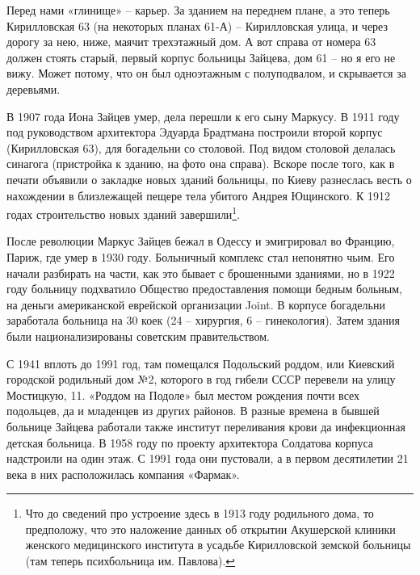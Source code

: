 Перед нами «глинище» – карьер. За зданием на переднем плане, а это теперь Кирилловская 63 (на некоторых планах 61-А) – Кирилловская улица, и через дорогу за нею, ниже, маячит трехэтажный дом. А вот справа от номера 63 должен стоять старый, первый корпус больницы Зайцева, дом 61 – но я его не вижу. Может потому, что он был одноэтажным с полуподвалом, и скрывается за деревьями. 

В 1907 года Иона Зайцев умер, дела перешли к его сыну Маркусу. В 1911 году под руководством архитектора Эдуарда Брадтмана построили второй корпус (Кирилловская 63), для богадельни со столовой. Под видом столовой делалась синагога (пристройка к зданию, на фото она справа). Вскоре после того, как в печати объявили о закладке новых зданий больницы, по Киеву разнеслась весть о нахождении в близлежащей пещере тела убитого Андрея Ющинского. К 1912 годах строительство новых зданий завершили\footnote{Что до сведений про устроение здесь в 1913 году родильного дома, то предположу, что это наложение данных об открытии Акушерской клиники женского медицинского института в усадьбе Кирилловской земской больницы (там теперь психбольница им. Павлова).}. 


После революции Маркус Зайцев бежал в Одессу и эмигрировал во Францию, Париж, где умер в 1930 году. Больничный комплекс стал непонятно чьим. Его начали разбирать на части, как это бывает с брошенными зданиями, но в 1922 году больницу подхватило Общество предоставления помощи бедным больным, на деньги американской еврейской организации Joint. В корпусе богадельни заработала больница на 30 коек (24 – хирургия, 6 – гинекология). Затем здания были национализированы советским правительством.

С 1941 вплоть до 1991 год, там помещался Подольский роддом, или Киевский городской родильный дом №2, которого в год гибели СССР перевели на улицу Мостицкую, 11. «Роддом на Подоле» был местом рождения почти всех подольцев, да и младенцев из других районов. В разные времена в бывшей больнице Зайцева работали также институт переливания крови да инфекционная детская больница. В 1958 году по проекту архитектора Солдатова корпуса надстроили на один этаж. С 1991 года они пустовали, а в первом десятилетии 21 века в них расположилась компания «Фармак». 


